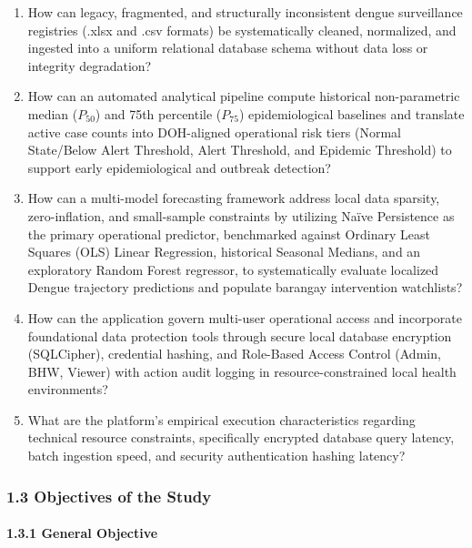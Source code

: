 \documentclass[
]{article}
\begin{document}
\begin{enumerate}
\def\labelenumi{\arabic{enumi}.}
\item
  How can legacy, fragmented, and structurally inconsistent dengue
  surveillance registries (.xlsx and .csv formats) be systematically
  cleaned, normalized, and ingested into a uniform relational database
  schema without data loss or integrity degradation?
\item
  How can an automated analytical pipeline compute historical
  non-parametric median (\(P_{50}\)) and 75th percentile (\(P_{75}\))
  epidemiological baselines and translate active case counts into
  DOH-aligned operational risk tiers (Normal State/Below Alert
  Threshold, Alert Threshold, and Epidemic Threshold) to support early
  epidemiological and outbreak detection?
\item
  How can a multi-model forecasting framework address local data
  sparsity, zero-inflation, and small-sample constraints by utilizing
  Naïve Persistence as the primary operational predictor, benchmarked
  against Ordinary Least Squares (OLS) Linear Regression, historical
  Seasonal Medians, and an exploratory Random Forest regressor, to
  systematically evaluate localized Dengue trajectory predictions and
  populate barangay intervention watchlists?
\item
  How can the application govern multi-user operational access and
  incorporate foundational data protection tools through secure local
  database encryption (SQLCipher), credential hashing, and Role-Based
  Access Control (Admin, BHW, Viewer) with action audit logging in
  resource-constrained local health environments?
\item
  What are the platform's empirical execution characteristics regarding
  technical resource constraints, specifically encrypted database query
  latency, batch ingestion speed, and security authentication hashing
  latency?
\end{enumerate}

\subsubsection{\texorpdfstring{\textbf{1.3 Objectives of the
Study}}{1.3 Objectives of the Study}}\label{objectives-of-the-study}

\paragraph{\texorpdfstring{\textbf{1.3.1 General
Objective}}{1.3.1 General Objective}}\label{general-objective}
\end{document}
